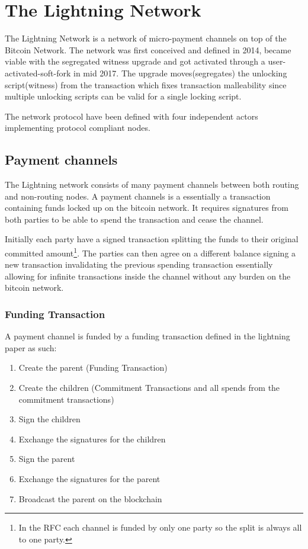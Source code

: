 \chapter{The Lightning Network}
\label{sec:lightning:network}

The Lightning Network is a network of micro-payment channels on top of the Bitcoin Network. The network was first conceived and defined in 2014\cite{poon:dryja:lightning:network}, became viable with the segregated witness upgrade\cite{bip:0141:segwit} and got activated through a user-activated-soft-fork in mid 2017\cite{bip:uasf:segwit}. The upgrade moves(segregates) the unlocking script(witness) from the transaction which fixes transaction malleability since multiple unlocking scripts can be valid for a single locking script. 

The network protocol have been defined\cite{repository:lightning:rfc} with four independent actors implementing protocol compliant nodes\cite{repository:lnd}\cite{repository:eclair}\cite{repository:clightning}\cite{repository:lit}.

\section{Payment channels}

The Lightning network consists of many payment channels between both routing and non-routing nodes.
A payment channels is a essentially a transaction containing funds locked up on the bitcoin network. It requires signatures from both parties to be able to spend the transaction and cease the channel.

Initially each party have a signed transaction splitting the funds to their original committed amount\footnote{In the RFC each channel is funded by only one party so the split is always all to one party.}. The parties can then agree on a different balance signing a new transaction invalidating the previous spending transaction essentially allowing for infinite transactions inside the channel without any burden on the bitcoin network.

\subsection{Funding Transaction}

A payment channel is funded by a funding transaction defined in the lightning paper as such\cite{poon:dryja:lightning:network}:
\begin{enumerate}
	\item  Create the parent (Funding Transaction)
	\item  Create the children (Commitment Transactions and all spends from the commitment transactions)
	\item  Sign the children
	\item  Exchange the signatures for the children
	\item  Sign the parent
	\item  Exchange the signatures for the parent
	\item  Broadcast the parent on the blockchain
\end{enumerate}

